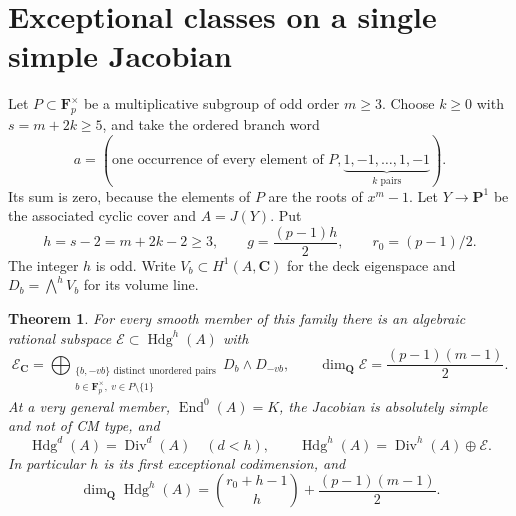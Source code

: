\documentclass[11pt]{article}
\newtheorem{theorem}{Theorem}[section]
\theoremstyle{definition}
\newcommand{\Q}{\mathbf Q}
\newcommand{\C}{\mathbf C}
\newcommand{\F}{\mathbf F}
\newcommand{\Hdg}{\operatorname{Hdg}}
\newcommand{\Div}{\operatorname{Div}}
\newcommand{\End}{\operatorname{End}}
\begin{document}
\section{Exceptional classes on a single simple Jacobian}\label{sec:exceptional}
Let $P\subset\F_p^\times$ be a multiplicative subgroup of odd order
$m\ge3$. Choose $k\ge0$ with $s=m+2k\ge5$, and take the ordered
branch word
\begin{equation}\label{eq:subgroupword}
 a=(\text{one occurrence of every element of }P,
                         \underbrace{1,-1,\ldots,1,-1}_{k\text{ pairs}}).
\end{equation}
Its sum is zero, because the elements of $P$ are the roots of $x^m-1$.
Let $Y\to\mathbf P^1$ be the associated cyclic cover and $A=J(Y)$.
Put
\[
 h=s-2=m+2k-2\ge3,\qquad g=\frac{(p-1)h}{2},\qquad r_0=(p-1)/2.
\]
The integer $h$ is odd. Write $V_b\subset H^1(A,\C)$ for the deck
eigenspace and $D_b=\bigwedge^hV_b$ for its volume line.

\begin{theorem}\label{thm:exceptional}
For every smooth member of this family there is an algebraic rational
subspace $\mathscr E\subset\Hdg^h(A)$ with
\begin{equation}\label{eq:exceptionalspace}
 \mathscr E_\C=
 \bigoplus_{\substack{\{b,-vb\}\text{ distinct unordered pairs}\\
             b\in\F_p^\times,\ v\in P\setminus\{1\}}}
             D_b\wedge D_{-vb},
 \qquad \dim_\Q\mathscr E=\frac{(p-1)(m-1)}2.
\end{equation}
At a very general member, $\End^0(A)=K$, the Jacobian is absolutely simple
and not of CM type, and
\[
 \Hdg^d(A)=\Div^d(A)\quad(d<h),\qquad
 \Hdg^h(A)=\Div^h(A)\oplus\mathscr E.
\]
In particular $h$ is its first exceptional codimension, and
\[
 \dim_\Q\Hdg^h(A)=
        \binom{r_0+h-1}{h}+\frac{(p-1)(m-1)}2.
\]
\end{theorem}
\end{document}
